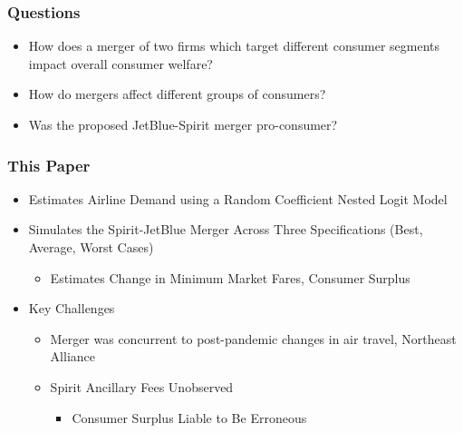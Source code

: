 \documentclass[xcolor=dvipsnames]{beamer}
\begin{document}
    \begin{frame}
    \frametitle{Questions}
        \begin{itemize}
        \item How does a merger of two firms which target different consumer segments impact overall consumer welfare?
        \item How do mergers affect different groups of consumers?
        \item Was the proposed JetBlue-Spirit merger pro-consumer?
        \end{itemize}   
    \end{frame}

    \begin{frame}
        \frametitle{This Paper}
        \begin{itemize}
            \item Estimates Airline Demand using a Random Coefficient Nested Logit Model
            \item Simulates the Spirit-JetBlue Merger Across Three Specifications (Best, Average, Worst Cases)
            \begin{itemize}
                \item Estimates Change in Minimum Market Fares, Consumer Surplus
            \end{itemize}
            \item Key Challenges
            \begin{itemize}
                \item Merger was concurrent to post-pandemic changes in air travel, Northeast Alliance
                \item Spirit Ancillary Fees Unobserved
                \begin{itemize}
                    \item Consumer Surplus Liable to Be Erroneous
                \end{itemize}
                \end{itemize}
        \end{itemize}
    \end{frame}
\end{document}
